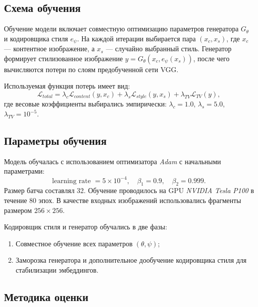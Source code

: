 \documentclass{article}
\begin{document}
\subsection*{Схема обучения}

Обучение модели включает совместную оптимизацию параметров генератора $G_\theta$ и кодировщика стиля $e_\psi$.  
На каждой итерации выбирается пара $(x_c, x_s)$, где $x_c$ — контентное изображение, а $x_s$ — случайно выбранный стиль.  
Генератор формирует стилизованное изображение $y = G_\theta(x_c, e_\psi(x_s))$, после чего вычисляются потери по слоям предобученной сети VGG.


Используемая функция потерь имеет вид:
$$
\mathcal{L}_{total} = 
\lambda_c \mathcal{L}_{content}(y, x_c)
+ \lambda_s \mathcal{L}_{style}(y, x_s)
+ \lambda_{TV} \mathcal{L}_{TV}(y),
$$
где весовые коэффициенты выбирались эмпирически:
$\lambda_c = 1.0$, $\lambda_s = 5.0$, $\lambda_{TV} = 10^{-5}$.

\subsection*{Параметры обучения}

Модель обучалась с использованием оптимизатора \textit{Adam} с начальными параметрами:
$$
\text{learning rate } = 5 \times 10^{-4}, \quad \beta_1 = 0.9, \quad \beta_2 = 0.999.
$$
Размер батча составлял 32.  
Обучение проводилось на GPU \textit{NVIDIA Tesla P100} в течение 80 эпох.  
В качестве входных изображений использовались фрагменты размером $256 \times 256$.  

Кодировщик стиля и генератор обучались в две фазы:
\begin{enumerate}
    \item Совместное обучение всех параметров $(\theta, \psi)$;
    \item Заморозка генератора и дополнительное дообучение кодировщика стиля для стабилизации эмбеддингов.
\end{enumerate}

\subsection*{Методика оценки}
\end{document}
